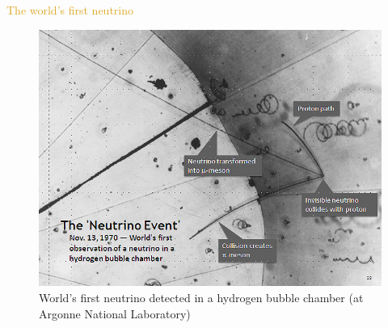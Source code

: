 \documentclass[11pt]{beamer} %
\renewcommand{\(}{\begin{columns}}
\renewcommand{\)}{\end{columns}}
\newcommand{\<}[1]{\begin{column}{#1}}
\renewcommand{\>}{\end{column}}
\begin{document}
\begin{frame}{\textcolor{Goldenrod}{The world's first neutrino}}
  \begin{figure}[h]
    \centering
    \includegraphics[width=0.85\linewidth, height=0.65\textheight]{./Images/FirstNeutrinoEventAnnotated}
    \caption*{\alert{World's first neutrino detected in a hydrogen bubble chamber (at Argonne National Laboratory)}}
  \end{figure}
\end{frame}
\end{document}

